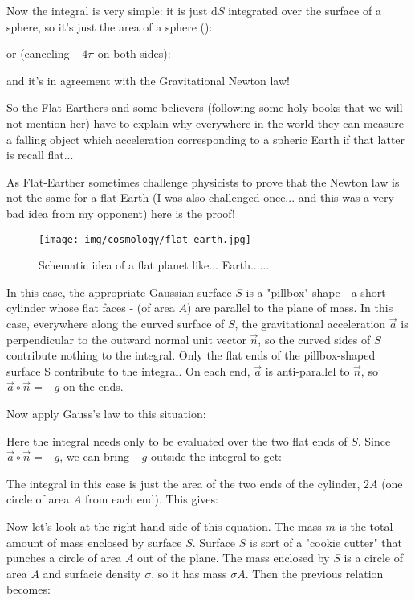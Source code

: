 	Now the integral is very simple: it is just $\mathrm{d}S$ integrated over the surface of a sphere, so it's just the area of a sphere ():
	
	or (canceling $-4\pi$ on both sides):
	
	and it's in agreement with the Gravitational Newton law!
	
	So the Flat-Earthers and some believers (following some holy books that we will not mention her) have to explain why everywhere in the world they can measure a falling object which acceleration corresponding to a spheric Earth if that latter is recall flat...

	As Flat-Earther sometimes challenge physicists to prove that the Newton law is not the same for a flat Earth (I was also challenged once... and this was a very bad idea from my opponent) here is the proof!
	\begin{figure}[H]
		\centering
		\texttt{[image: img/cosmology/flat\_earth.jpg]}
		\caption[]{Schematic idea of a flat planet like... Earth......}
	\end{figure}
	In this case, the appropriate Gaussian surface $S$ is a "pillbox" shape - a short cylinder whose flat faces - (of area $A$) are parallel to the plane of mass. In this case, everywhere along the curved surface of $S$, the gravitational acceleration $\vec{a}$ is perpendicular to the outward normal unit vector $\vec{n}$, so the curved sides of $S$ contribute nothing to the integral. Only the flat ends of the pillbox-shaped surface S contribute to the integral. On each end, $\vec{a}$ is anti-parallel to $\vec{n}$, so $\vec{a}\circ\vec{n}=-g$ on the ends.
	
	Now apply Gauss's law to this situation:
	
	Here the integral needs only to be evaluated over the two flat ends of $S$. Since $\vec{a}\circ\vec{n}=-g$, we can bring $-g$ outside the integral to get:
	
	The integral in this case is just the area of the two ends of the cylinder, $2A$ (one circle of area $A$ from each end). This gives:
	
	Now let’s look at the right-hand side of this equation. The mass $m$ is the total amount of mass enclosed by surface $S$. Surface $S$ is sort of a "cookie cutter" that punches a circle of area $A$ out of the plane. The mass
enclosed by $S$ is a circle of area $A$ and surfacic density $\sigma$, so it has mass $\sigma A$. Then the previous relation becomes:
	
